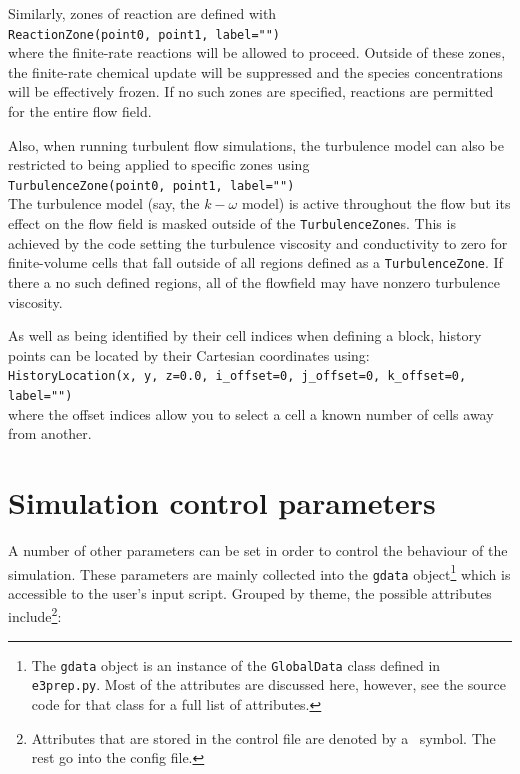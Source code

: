 \medskip
Similarly, zones of reaction are defined with\\
\texttt{ReactionZone(point0, point1, label="")}\\
where the finite-rate reactions will be allowed to proceed.
Outside of these zones, the finite-rate chemical update will be suppressed 
and the species concentrations will be effectively frozen.
If no such zones are specified, reactions are permitted for the entire flow field.

\medskip
Also, when running turbulent flow simulations, the turbulence model can also be
restricted to being applied to specific zones using\\
\texttt{TurbulenceZone(point0, point1, label="")}\\
The turbulence model (say, the $k-\omega$ model) is active throughout the flow
but its effect on the flow field is masked outside of the \texttt{TurbulenceZone}s.
This is achieved by the code setting the turbulence viscosity and conductivity to zero
for finite-volume cells that fall outside of all regions defined as a \texttt{TurbulenceZone}.
If there a no such defined regions, all of the flowfield may have nonzero turbulence viscosity.

\medskip
As well as being identified by their cell indices when defining a block,
history points can be located by their Cartesian coordinates using:\\
\texttt{HistoryLocation(x, y, z=0.0, i\_offset=0, j\_offset=0, k\_offset=0, label="")} \\
where the offset indices allow you to select a cell a known number of cells 
away from another.

\bigskip
\section{Simulation control parameters}
\label{sec:sim-control-parameters}
%
A number of other parameters can be set in order to control the behaviour of
the simulation.
These parameters are mainly collected into the \texttt{gdata}
object\footnote{The \texttt{gdata} object is an instance of the \texttt{GlobalData}
  class defined in \texttt{e3prep.py}. Most of the attributes are discussed here,
  however, see the source code for that class for a full list of attributes.} 
which is accessible to the user's input script.
Grouped by theme, the possible attributes include\footnote{Attributes that are stored in the control file
are denoted by a \ddag ~symbol.  The rest go into the config file.}:
